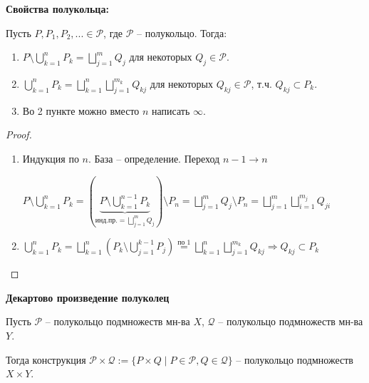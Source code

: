 \begin{theorem}
    \textbf{Свойства полукольца:}

    Пусть $P, P_1, P_2, ... \in \mathcal{P}$, где $\mathcal{P}$ – полукольцо. Тогда:
    \begin{enumerate}
        \item $P\setminus \bigcup\limits_{k=1}^n P_k= \bigsqcup\limits_{j=1}^m Q_j$ для некоторых $Q_j\in \mathcal{P}$.
        \item $\bigcup\limits_{k=1}^n P_k=\bigsqcup\limits_{k=1}^n \bigsqcup\limits_{j=1}^{m_k} Q_{kj}$ для некоторых $Q_{kj}\in \mathcal{P}$, т.ч. $Q_{kj}\subset P_k$.
        \item Во 2 пункте можно вместо $n$ написать $\infty$.
    \end{enumerate}
\end{theorem}

\begin{proof}~
    \begin{enumerate}
        \item Индукция по $n$. База – определение. Переход $n -1 \rightarrow n$
        
        $P \setminus \bigcup\limits_{k=1}^n P_k = (\underbrace{P \setminus \bigcup\limits_{k=1}^{n-1} P_k}_{\text{инд.пр.} = \bigsqcup\limits_{j=1}^m Q_j}) 
        \setminus P_n=\bigsqcup\limits_{j=1}^m Q_j \setminus P_n = \bigsqcup\limits_{j=1}^m\bigsqcup\limits_{i=1}^{m_j} Q_{ji}$

        \item $\bigcup\limits_{k=1}^n P_k = \bigsqcup\limits_{k=1}^n (P_k \setminus \bigcup\limits_{j=1}^{k -1} P_j)\overset{\text{по 1}}{=}\bigsqcup\limits_{k=1}^n \bigsqcup\limits_{j=1}^{m_k}Q_{kj}\Rightarrow Q_{kj}\subset P_k$
    \end{enumerate}
\end{proof}

\begin{theorem}
    \textbf{Декартово произведение полуколец}

    Пусть $\mathcal{P}$ – полукольцо подмножеств мн-ва $X$, $\mathcal{Q}$ – полукольцо подмножеств мн-ва $Y$.

    Тогда конструкция $\mathcal{P}\times \mathcal{Q} := \{ P\times Q \mid P \in \mathcal{P}, Q\in \mathcal{Q}\}$ – полукольцо подмножеств $X\times Y$.
\end{theorem}

